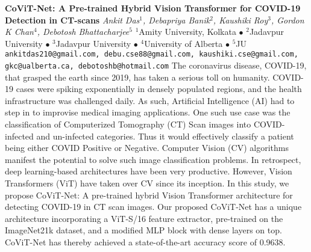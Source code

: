 
    \begin{conf-abstract}[]
        {\textbf{CoViT-Net: A Pre-trained Hybrid Vision Transformer for COVID-19 Detection in CT-scans}}
        {\textit{Ankit Das$^{1}$, Debapriya Banik$^{2}$, Kaushiki Roy$^{3}$, Gordon K Chan$^{4}$, Debotosh Bhattacharjee$^{5}$}}
        {$^{1}$Amity University, Kolkata $\bullet$ $^{2}$Jadavpur University $\bullet$ $^{3}$Jadavpur University $\bullet$ $^{4}$University of Alberta $\bullet$ $^{5}$JU}
        {\texttt{ankitdas210@gmail.com, debu.cse88@gmail.com, kaushiki.cse@gmail.com, gkc@ualberta.ca, debotoshb@hotmail.com}}
        {The coronavirus disease, COVID-19, that grasped the earth since 2019, has taken a serious toll on humanity. COVID-19 cases were spiking exponentially in densely populated regions, and the health infrastructure was challenged daily. As such, Artificial Intelligence (AI) had to step in to improvise medical imaging applications. One such use case was the classification of Computerized Tomography (CT) Scan images into COVID-infected and un-infected categories. Thus it would effectively classify a patient being either COVID Positive or Negative. Computer Vision (CV) algorithms manifest the potential to solve such image classification problems. In retrospect, deep learning-based architectures have been very productive. However, Vision Transformers (ViT) have taken over CV since its inception. In this study, we propose CoViT-Net: A pre-trained hybrid Vision Transformer architecture for detecting COVID-19 in CT scan images. Our proposed CoViT-Net has a unique architecture incorporating a ViT-S/16 feature extractor, pre-trained on the ImageNet21k dataset, and a modified MLP block with dense layers on top. CoViT-Net has thereby achieved a state-of-the-art accuracy score of 0.9638.}
    \end{conf-abstract}
        